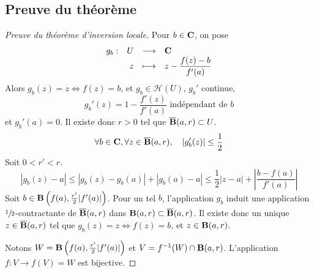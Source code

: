 \subsection{Preuve du théorème}

\begin{proof}[Preuve du théorème d'inversion locale]
Pour $b \in  \mathbf C$, on pose \[
\begin{array}{rrcl}
    g_b:& U & \longrightarrow & \mathbf C \\
        & z & \longmapsto & \displaystyle z- \frac{f(z)-b}{f'(a)}
\end{array}
\] 
Alors $g_b(z)=z \iff  f(z)=b$, et $g_b \in  \mathcal  H(U)$, $g_b'$ continue,  \[
    g_b'(z)=1-\frac{f'(z)}{f'(a)} \text{ indépendant de }b
\]
et $g_b'(a)=0$. Il existe donc $r>0$ tel que  $\overline{\mathbf B}(a, r)\subset U$. \[
    \forall  b \in  \mathbf C, \forall  z \in  \overline{\mathbf B}(a, r), \quad  |g_b'(z)|\leq \frac{1}{2}
\] 
Soit $0<r'<r$.  \[
    |g_b(z)-a|\leq |g_b(z)-g_b(a)|+|g_b(a)-a|\leq \frac{1}{2} |z-a|+ \left| \frac{b-f(a)}{f'(a)} \right|
\] 
Soit $b \in  \mathbf B \left(f(a), \frac{r'}2 |f'(a)|\right)$. Pour un tel $b$, l'application  $g_b$ induit une application $\sfrac{1}{2}$-contractante  de $\overline{\mathbf B}(a, r)$ dans $\mathbf B(a, r)\subset \overline{\mathbf B}(a, r)$.
Il existe donc un unique $z \in  \overline{\mathbf B}(a, r)$ tel que $g_b(z)=z \iff  f(z)=b$, et $z \in  \mathbf B(a, r)$.


Notons $W=\mathbf B \left(f(a), \frac{r'}2 |f'(a)|\right)$ et  $V=f^{-1}(W)\cap \mathbf B(a, r)$. L'application $f:V\longrightarrow f(V)=W$ est bijective. 

\end{proof}
